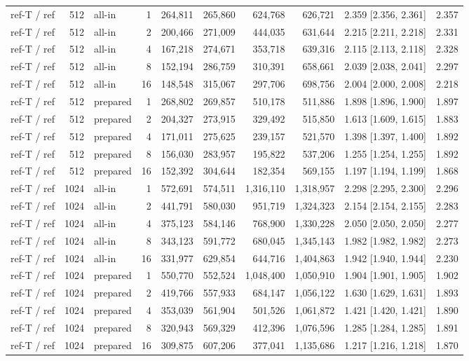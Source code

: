 \begin{table}[t]
{\begin{tabular}{lrlrrrrrlr}
ref-T / ref & 512 & all-in & 1 & 264{,}811 & 265{,}860 & 624{,}768 & 626{,}721 & 2.359 [2.356, 2.361] & 2.357 \\
ref-T / ref & 512 & all-in & 2 & 200{,}466 & 271{,}009 & 444{,}035 & 631{,}644 & 2.215 [2.211, 2.218] & 2.331 \\
ref-T / ref & 512 & all-in & 4 & 167{,}218 & 274{,}671 & 353{,}718 & 639{,}316 & 2.115 [2.113, 2.118] & 2.328 \\
ref-T / ref & 512 & all-in & 8 & 152{,}194 & 286{,}759 & 310{,}391 & 658{,}661 & 2.039 [2.038, 2.041] & 2.297 \\
ref-T / ref & 512 & all-in & 16 & 148{,}548 & 315{,}067 & 297{,}706 & 698{,}756 & 2.004 [2.000, 2.008] & 2.218 \\
ref-T / ref & 512 & prepared & 1 & 268{,}802 & 269{,}857 & 510{,}178 & 511{,}886 & 1.898 [1.896, 1.900] & 1.897 \\
ref-T / ref & 512 & prepared & 2 & 204{,}327 & 273{,}915 & 329{,}492 & 515{,}850 & 1.613 [1.609, 1.615] & 1.883 \\
ref-T / ref & 512 & prepared & 4 & 171{,}011 & 275{,}625 & 239{,}157 & 521{,}570 & 1.398 [1.397, 1.400] & 1.892 \\
ref-T / ref & 512 & prepared & 8 & 156{,}030 & 283{,}957 & 195{,}822 & 537{,}206 & 1.255 [1.254, 1.255] & 1.892 \\
ref-T / ref & 512 & prepared & 16 & 152{,}392 & 304{,}644 & 182{,}354 & 569{,}155 & 1.197 [1.194, 1.199] & 1.868 \\
ref-T / ref & 1024 & all-in & 1 & 572{,}691 & 574{,}511 & 1{,}316{,}110 & 1{,}318{,}957 & 2.298 [2.295, 2.300] & 2.296 \\
ref-T / ref & 1024 & all-in & 2 & 441{,}791 & 580{,}030 & 951{,}719 & 1{,}324{,}323 & 2.154 [2.154, 2.155] & 2.283 \\
ref-T / ref & 1024 & all-in & 4 & 375{,}123 & 584{,}146 & 768{,}900 & 1{,}330{,}228 & 2.050 [2.050, 2.050] & 2.277 \\
ref-T / ref & 1024 & all-in & 8 & 343{,}123 & 591{,}772 & 680{,}045 & 1{,}345{,}143 & 1.982 [1.982, 1.982] & 2.273 \\
ref-T / ref & 1024 & all-in & 16 & 331{,}977 & 629{,}854 & 644{,}716 & 1{,}404{,}863 & 1.942 [1.940, 1.944] & 2.230 \\
ref-T / ref & 1024 & prepared & 1 & 550{,}770 & 552{,}524 & 1{,}048{,}400 & 1{,}050{,}910 & 1.904 [1.901, 1.905] & 1.902 \\
ref-T / ref & 1024 & prepared & 2 & 419{,}766 & 557{,}933 & 684{,}147 & 1{,}056{,}122 & 1.630 [1.629, 1.631] & 1.893 \\
ref-T / ref & 1024 & prepared & 4 & 353{,}039 & 561{,}904 & 501{,}526 & 1{,}061{,}872 & 1.421 [1.420, 1.421] & 1.890 \\
ref-T / ref & 1024 & prepared & 8 & 320{,}943 & 569{,}329 & 412{,}396 & 1{,}076{,}596 & 1.285 [1.284, 1.285] & 1.891 \\
ref-T / ref & 1024 & prepared & 16 & 309{,}875 & 607{,}206 & 377{,}041 & 1{,}135{,}686 & 1.217 [1.216, 1.218] & 1.870 \\
\bottomrule
\end{tabular}}
\end{table}

